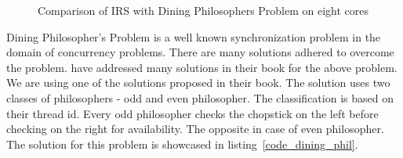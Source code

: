 \begin{figure}[h]
     \centering
     \caption{Comparison of IRS with Dining Philosophers Problem on eight cores}
\end{figure}

Dining Philosopher's Problem is a well known synchronization problem in the domain of concurrency problems. 
There are many solutions adhered to overcome the problem. 
\citet{silberschatz2014operating} have addressed many solutions in their book for the above problem. 
We are using one of the solutions proposed in their book. 
The solution uses two classes of philosophers - odd and even philosopher. 
The classification is based on their thread id. 
Every odd philosopher checks the chopstick on the left before checking on the right for availability. 
The opposite in case of even philosopher. 
The solution for this problem is showcased in listing~\ref{code_dining_phil}.

